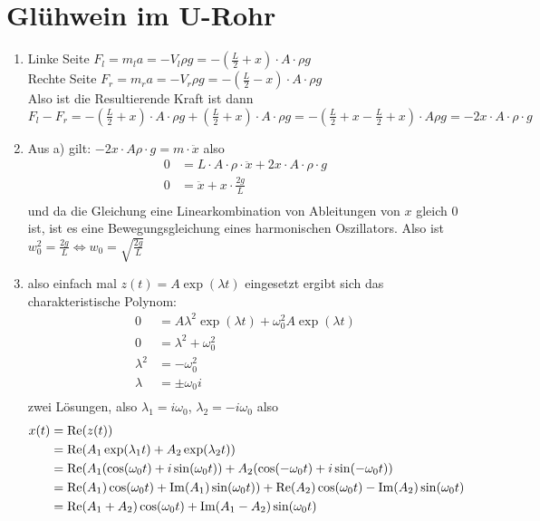 \documentclass[sectionformat = exercise]{gadsescript}
\begin{document}
\maketitle
\section{Glühwein im U-Rohr}
\begin{enumerate}[label=\alph*)]
	\item Linke Seite $ F_l = m_la = - V_l\rho g = - \left(\frac{ L }{ 2 } +x\right) \cdot  A \cdot \rho g $ \\
		Rechte Seite $ F_r = m_ra = - V_r \rho g = - \left( \frac{ L }{ 2 } - x \right) \cdot  A \cdot  \rho g $\\
		Also ist die Resultierende Kraft ist dann $ F_l - F_r = - \left(\frac{ L }{ 2 } +x\right) \cdot A \cdot \rho g + \left(\frac{ L }{ 2 } +x\right) \cdot A \cdot \rho g = - \left( \frac{ L }{ 2 } + x - \frac{ L }{ 2 } + x \right) \cdot A \rho g = - 2x\cdot A\cdot \rho \cdot g $
	\item Aus a) gilt: $ - 2 x \cdot A \rho \cdot g = m \cdot \ddot x $ 
		also
		\begin{align*}
			0 &= L \cdot A \cdot \rho \cdot \ddot x + 2 x \cdot A \cdot \rho \cdot g\\
			0 &= \ddot x + x \cdot \frac{ 2g }{ L } \\
		\end{align*}
		und da die Gleichung eine Linearkombination von Ableitungen von $ x $ gleich $ 0 $ ist, ist es eine Bewegungsgleichung eines harmonischen Oszillators.
		Also ist $ w_0^2 = \frac{2g}{ L } \iff w_0 = \sqrt{ \frac{ 2g }{ L } }  $
	\item also einfach mal $ z(t) = A \exp(\lambda t) $ eingesetzt ergibt sich das charakteristische Polynom:
		\begin{align*}
			 0 &= A\lambda^2 \exp(\lambda t) + \omega_0^2 A\exp(\lambda t) \\
			 0 &= \lambda^2 + \omega_0^2 \\
			 \lambda^2 &= - \omega_0^2 \\
			 \lambda &= \pm\omega_0 i \\
		\end{align*}
		zwei Lösungen, also $ \lambda_1 = i\omega_0 $, $ \lambda_2 = -i\omega_0 $ 
		also 
		\begin{align*}
			x(t) &= \operatorname{Re}(z(t)) \\
			~ &= \operatorname{Re}(A_1\exp(\lambda_1 t ) + A_2\exp(\lambda_2 t )) \\
			~ &= \operatorname{Re}(A_1(\cos(\omega_0 t) + i\sin(\omega_0 t )) + A_2(\cos(-\omega_0 t) + i\sin(-\omega_0 t )) \\
			~ &= \operatorname{Re}(A_1)\cos(\omega_0 t) + \operatorname{Im}(A_1)\sin(\omega_0 t )) + \operatorname{Re}(A_2)\cos(\omega_0 t) - \operatorname{Im}(A_2)\sin(\omega_0 t ) \\
			~ &= \operatorname{Re}(A_1 + A_2)\cos(\omega_0 t) + \operatorname{Im}(A_1 - A_2)\sin(\omega_0 t ) \\
		\end{align*}
		

\end{enumerate}
\end{document}
